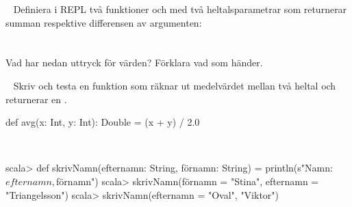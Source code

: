 
\QUESTBEGIN

\Task  \what~  Definiera i REPL två funktioner  och  med två heltalsparametrar som returnerar summan respektive differensen av argumenten: \\
 \\
 \\
Vad har nedan uttryck för värden? Förklara vad som händer.

\Subtask {}

\Subtask {}

\Subtask {}

\Subtask {}

\SOLUTION

\TaskSolved \what

\SubtaskSolved  {}

\SubtaskSolved  {}

\SubtaskSolved  {}

\SubtaskSolved  {}

\QUESTEND




\QUESTBEGIN

\Task  \what~ Skriv och testa en funktion  som räknar ut medelvärdet mellan två heltal och returnerar en .

\SOLUTION

\TaskSolved \what

\begin{Code}
def avg(x: Int, y: Int): Double = (x + y) / 2.0
\end{Code}

\QUESTEND





\QUESTBEGIN

\Task  \what~
\begin{REPL}
scala> def skrivNamn(efternamn: String, förnamn: String) =
         println(s"Namn: $efternamn, $förnamn")
scala> skrivNamn(förnamn = "Stina", efternamn = "Triangelsson")
scala> skrivNamn(efternamn = "Oval", "Viktor")

\end{REPL}

